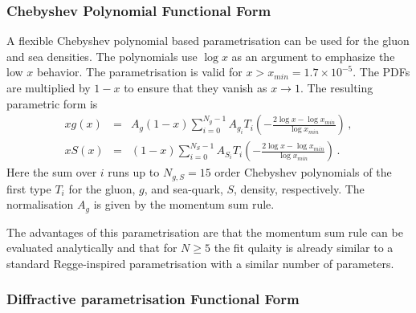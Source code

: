 \subsubsection{Chebyshev Polynomial Functional Form}
\label{sec:cheb}
A flexible Chebyshev polynomial based parametrisation can be used for the gluon and sea densities. The polynomials
use $\log x$ as an argument to emphasize the low $x$ behavior. 
The parametrisation is valid for $x>x_{min} = 1.7\times 10^{-5}$. The PDFs are multiplied
by $1-x$ to ensure that they vanish as $x\to 1$. The resulting parametric form is 
\begin{eqnarray}
x g(x) &=& A_g \left(1-x\right) \sum_{i=0}^{N_g-1} A_{g_i} T_i \left(-\frac{\textstyle 2\log x - \log x_{min} } {\textstyle \log x_{min} } \right)\,, \label{eq:glu} \\
x S(x) &=& \left(1-x\right) \sum_{i=0}^{N_S-1} A_{S_i} T_i \left(-\frac{\textstyle 2\log x - \log x_{min} } {\textstyle \log x_{min} } \right)\,. \label{eq:sea} 
\end{eqnarray}
Here the sum over $i$ runs up to $N_{g,S}=15$ order Chebyshev polynomials of the first type $T_i$ for
the gluon, $g$, and sea-quark, $S$, density, respectively. 
The normalisation $A_g$ is given by the momentum sum rule.

The advantages of this parametrisation are that the momentum sum rule can be evaluated analytically 
and that for $N \ge 5$ the fit qulaity is already similar
to a standard Regge-inspired parametrisation with a similar number of parameters.

\subsubsection {Diffractive parametrisation Functional Form}

